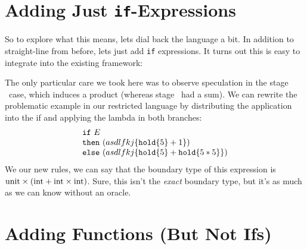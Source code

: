 \documentclass[]{article}
\newcommand {\next}{asdlfkj}
\begin{document}
\section{Adding Just \texttt{if}-Expressions}

So to explore what this means, lets dial back the language a bit.  
In addition to straight-line from before, lets just add \texttt{if} expressions.
It turns out this is easy to integrate into the existing framework:


The only particular care we took here was to observe speculation in the stage \bbtwo\ case,
which induces a product (whereas stage \bbone\ had a sum).
We can rewrite the problematic example in our restricted language 
by distributing the application into the if and applying the lambda in both branches:
\[
\tallif {E}
	{(\next\{\pause\{5\}+1\})}
	{(\next\{\pause\{5\}+\pause\{5*5\}\})}
\]
We our new rules, we can say that the boundary type of this expression is
${\rm unit} \times ({\rm int} + {\rm int} \times {\rm int})$.
Sure, this isn't the {\em exact} boundary type, 
but it's as much as we can know without an oracle.

\section{Adding Functions (But Not Ifs)}



\end{document}
